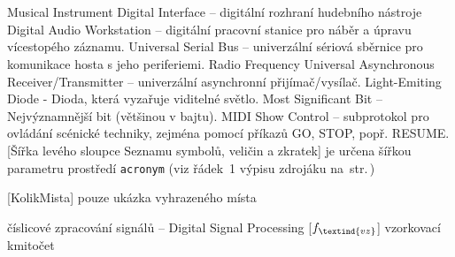 \cleardoublepage
\chapter*{\listofabbrevname}
{}

\begin{acronym}[KolikMista]
        {Musical Instrument Digital Interface -- digitální rozhraní hudebního nástroje}
        {Digital Audio Workstation -- digitální pracovní stanice pro náběr a úpravu vícestopého záznamu.}
        {Universal Serial Bus -- univerzální sériová sběrnice pro komunikace hosta s jeho periferiemi.}
        {Radio Frequency}
        {Universal Asynchronous Receiver/Transmitter -- univerzální asynchronní přijímač/vysílač.}
        {Light-Emiting Diode - Dioda, která vyzařuje viditelné světlo.}
        {Most Significant Bit -- Nejvýznamnější bit (většinou v bajtu).}
        {\acs{MIDI} Show Control -- subprotokol pro ovládání scénické techniky, zejména pomocí příkazů GO, STOP, popř. RESUME.}
		[Šířka levého sloupce Seznamu symbolů, veličin a zkratek]								%
		{je určena šířkou parametru prostředí \texttt{acronym} (viz řádek~1 výpisu zdrojáku na~str.\,\pageref{lst:zkratky})}

		[KolikMista]
		{pouze ukázka vyhrazeného místa}

		{číslicové zpracování signálů -- Digital Signal Processing}
		[\ensuremath{f_\textind{vz}}] %
		{vzorkovací kmitočet}					%

\end{acronym}
